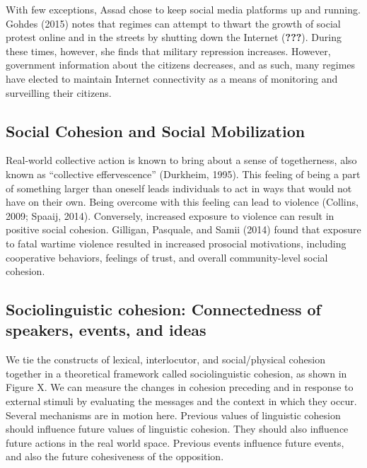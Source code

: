 \documentclass[english,man]{apa6}
\begin{document}
With few exceptions, Assad chose to keep social media platforms up and running. Gohdes (2015) notes that regimes can attempt to thwart the growth of social protest online and in the streets by shutting down the Internet ({\textbf{???}}). During these times, however, she finds that military repression increases. However, government information about the citizens decreases, and as such, many regimes have elected to maintain Internet connectivity as a means of monitoring and surveilling their citizens.

\hypertarget{social-cohesion-and-social-mobilization}{%
\subsection{Social Cohesion and Social Mobilization}\label{social-cohesion-and-social-mobilization}}

Real-world collective action is known to bring about a sense of togetherness,
also known as \enquote{collective effervescence} (Durkheim, 1995). This
feeling of being a part of something larger than oneself leads individuals
to act in ways that would not have on their own. Being overcome with this
feeling can lead to violence (Collins, 2009; Spaaij, 2014).
Conversely, increased exposure
to violence can result in positive social cohesion. Gilligan, Pasquale, and Samii (2014)
found that exposure to fatal wartime violence resulted in increased prosocial
motivations, including cooperative behaviors, feelings of trust, and overall
community-level social cohesion.

\hypertarget{sociolinguistic-cohesion-connectedness-of-speakers-events-and-ideas}{%
\subsection{Sociolinguistic cohesion: Connectedness of speakers, events, and ideas}\label{sociolinguistic-cohesion-connectedness-of-speakers-events-and-ideas}}

We tie the constructs of lexical, interlocutor, and social/physical cohesion together in a theoretical framework called sociolinguistic cohesion, as shown in Figure X. We can measure the changes in cohesion preceding and in response to external stimuli by evaluating the messages and the context in which they occur. Several mechanisms are in motion here. Previous values of linguistic cohesion should influence future values of linguistic cohesion. They should also influence future actions in the real world space. Previous events influence future events, and also the future cohesiveness of the opposition.
\end{document}
